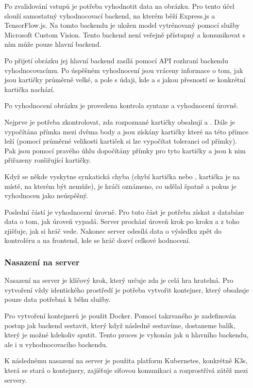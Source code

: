 Po zvalidování vstupů je potřeba vyhodnotit data na obrázku. Pro tento účel slouží samostatný vyhodnocovací backend, na kterém běží Express.js a TensorFlow.js. Na tomto backendu je uložen model vytrénovaný pomocí služby Microsoft Custom Vision. Tento backend není veřejně přístupný a komunikovat s ním může pouze hlavní backend.\par
Po přijetí obrázku jej hlavní backend zasílá pomocí API rozhraní backendu vyhodnocovacímu. Po úspěšném vyhodnocení jsou vráceny informace o tom, jak jsou kartičky průměrně velké, a pole s údaji, kde a s jakou přesností se konkrétní kartička nachází.

Po vyhodnocení obrázku je provedena kontrola syntaxe a vyhodnocení úrovně.\par
Nejprve je potřeba zkontrolovat, zda rozpoznané kartičky obsahují  a . Dále je vypočítána přímka mezi dvěma body a jsou získány kartičky které na této přímce leží (pomocí průměrné velikosti kartiček si lze vypočítat toleranci od přímky). Pak jsou pomocí pravého úhlu dopočítány přímky pro tyto kartičky a jsou k nim přiřazeny rozšiřující kartičky.\par
Když se někde vyskytne synkatická chyba (chybí kartička  nebo , kartička je na místě, na kterém být nemůže), je hráči oznámeno, co udělal špatně a pokus je vyhodnocen jako neúspěšný.\par
Poslední částí je vyhodnocení úrovně. Pro tuto část je potřeba získat z databáze data o tom, jak úroveň vypadá. Server prochází úroveň krok po kroku a z toho zjišťuje, jak si hráč vede. Nakonec server odesílá data o výsledku zpět do kontroléru a na frontend, kde se hráč dozví celkové hodnocení.

\subsubsection{Nasazení na server}
Nasazení na server je klíčový krok, který určuje zda je celá hra hratelná.
Pro vytvoření vždy identického prostředí je potřeba vytvořit kontejner, který obsahuje pouze data potřebná k běhu služby.\par
Pro vytvoření kontejnerů je použit Docker. Pomocí takzvaného  je zadefinován postup jak backend sestavit, který když následně sestavíme, dostaneme balík, který je možné kdekoliv sputit. Tento proces je vykonán jak u hlavního backendu, ale i u vyhodnocovacího backendu.\par
K následnému nasazení na server je použita platform Kubernetes, konkrétně K3s, která se stará o kontejnery, zajišťuje síťovou komunikaci a rozprostřívá zátěž mezi servery.
